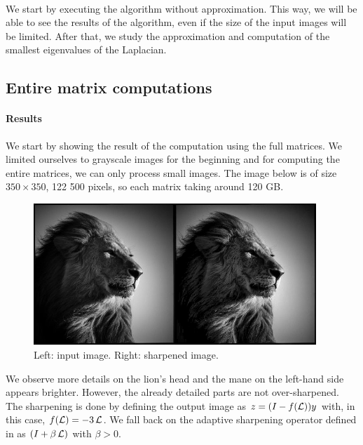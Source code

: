 \paragraph{}
We start by executing the algorithm without approximation.
This way, we will be able to see the results of the algorithm, even if the size of the input images will be limited.
After that, we study the approximation and computation of the smallest eigenvalues of the Laplacian.

\subsection{Entire matrix computations}

\paragraph{Results}
We start by showing the result of the computation using the full matrices.
We limited ourselves to grayscale images for the beginning and for computing the entire matrices, we can only process small images.
The image below is of size \(350 \times 350\), 122 500 pixels, so each matrix taking around 120 GB.

\begin{figure}[H]
  \centering
  \includegraphics[width=0.95\textwidth]{img/lion.png}
  \caption{Left: input image. Right: sharpened image.}
\end{figure}

We observe more details on the lion's head and the mane on the left-hand side appears brighter.
However, the already detailed parts are not over-sharpened.
The sharpening is done by defining the output image as \(z = (I - f(\operatorname{\mathcal{L}}))y\) with, in this case, \(f(\operatorname{\mathcal{L}}) = -3\operatorname{\mathcal{L}}\).
We fall back on the adaptive sharpening operator defined in \cite{siam_slides_2016} as \((I + \beta \operatorname{\mathcal{L}})\) with \(\beta > 0\).

